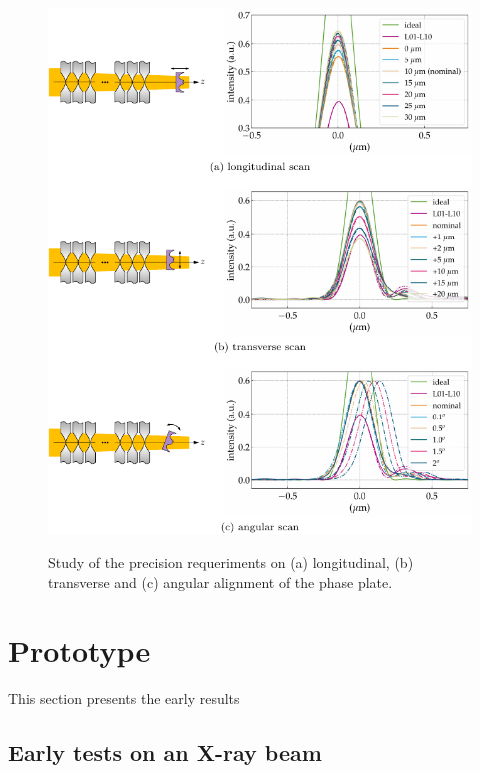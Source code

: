 \begin{refsection}
\begin{figure}[h]
        \centering
        {\includegraphics[width=0.6\linewidth]{figures/ch06/sensitivity_test.pdf}}
        \caption[Alignment sensitivity scan for the corrected system]{Study of the precision requeriments on (a) longitudinal, (b) transverse and (c) angular alignment of the phase plate.}\label{fig:tolerancing}
\end{figure}

\clearpage
\section{Prototype}\label{sec:prototype}

This section presents the early results 


\subsection{Early tests on an X-ray beam}\label{sec:prototype_testing}


\end{refsection}
